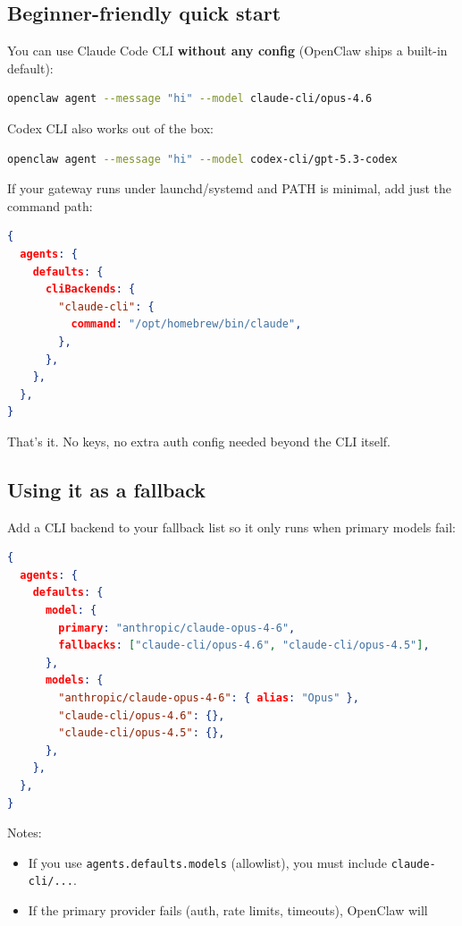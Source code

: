 \subsection{Beginner-friendly quick start}


You can use Claude Code CLI \textbf{without any config} (OpenClaw ships a built-in default):

\begin{lstlisting}[language=bash]
openclaw agent --message "hi" --model claude-cli/opus-4.6
\end{lstlisting}


Codex CLI also works out of the box:

\begin{lstlisting}[language=bash]
openclaw agent --message "hi" --model codex-cli/gpt-5.3-codex
\end{lstlisting}


If your gateway runs under launchd/systemd and PATH is minimal, add just the
command path:

\begin{lstlisting}[language=json]
{
  agents: {
    defaults: {
      cliBackends: {
        "claude-cli": {
          command: "/opt/homebrew/bin/claude",
        },
      },
    },
  },
}
\end{lstlisting}


That’s it. No keys, no extra auth config needed beyond the CLI itself.

\subsection{Using it as a fallback}


Add a CLI backend to your fallback list so it only runs when primary models fail:

\begin{lstlisting}[language=json]
{
  agents: {
    defaults: {
      model: {
        primary: "anthropic/claude-opus-4-6",
        fallbacks: ["claude-cli/opus-4.6", "claude-cli/opus-4.5"],
      },
      models: {
        "anthropic/claude-opus-4-6": { alias: "Opus" },
        "claude-cli/opus-4.6": {},
        "claude-cli/opus-4.5": {},
      },
    },
  },
}
\end{lstlisting}


Notes:

\begin{itemize}
  \item If you use \texttt{agents.defaults.models} (allowlist), you must include \texttt{claude-cli/...}.
  \item If the primary provider fails (auth, rate limits, timeouts), OpenClaw will
\end{itemize}

